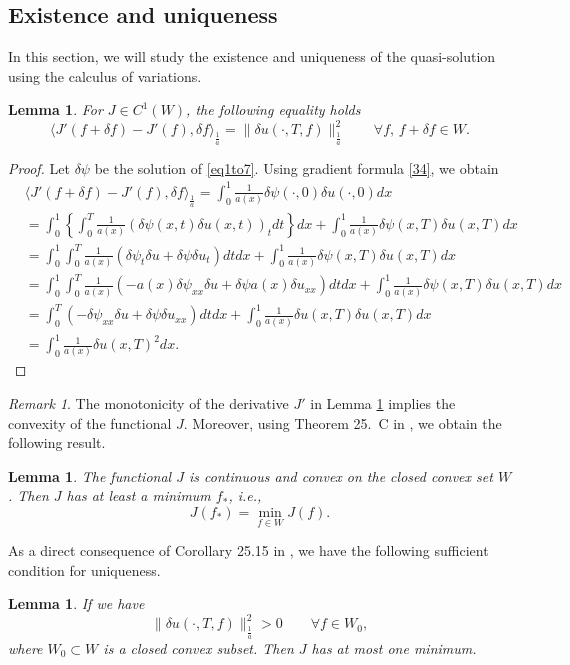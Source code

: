 \documentclass[reqno]{amsart}
\theoremstyle{plain}
\newtheorem{lemma}[theorem]{Lemma}
\theoremstyle{remark}
\newtheorem{remark}[theorem]{Remark}
\numberwithin{equation}{section}
\begin{document}
\subsection{Existence and uniqueness}
In this section, we will study the existence and uniqueness of the quasi-solution using the calculus of variations.
\begin{lemma}\label{lemmaexi}
    For $J\in C^1(W)$, the following equality holds
    $$ \langle J'(f+\delta f)-J'(f), \delta f \rangle_{\frac{1}{a}}=\|\delta u(\cdot,T,f)\|^2_{\frac{1}{a}} \qquad \forall f,\, f+\delta f \in W.$$
\end{lemma}
\begin{proof}
    Let $\delta \psi$ be the solution of \eqref{eq1to7}. Using gradient formula \eqref{34}, we obtain
    \begin{equation*}
        \begin{aligned}
    &\langle J'(f+\delta f)-J'(f), \delta f\rangle_{\frac{1}{a}}=\int_{0}^1 \frac{1}{a(x)}\delta \psi(\cdot,0)\delta u(\cdot,0) dx\\&=\int_{ 0}^1 \left\lbrace \int_{0}^T \frac{1}{a(x)}\left( \delta\psi(x,t)\delta u(x,t)\right)_{t} dt\right\rbrace dx + \int_{ 0}^1\frac{1}{a(x)}\delta\psi(x,T)\delta u(x,T) dx\\ &= \int_{ 0}^1 \int_{0}^T\frac{1}{a(x)}\left( \delta\psi_{t}\delta u + \delta\psi \delta u_{t}\right) dt dx + \int_{ 0}^1\frac{1}{a(x)}\delta\psi(x,T)\delta u(x,T) dx \\ & = \int_{ 0}^1 \int_{0}^T\frac{1}{a(x)}\left( -a(x)\delta\psi_{xx}\delta u + \delta\psi a(x)\delta u_{xx}\right) dt dx + \int_{ 0}^1\frac{1}{a(x)}\delta\psi(x,T)\delta u(x,T) dx \\&= \int_{0}^T\left( -\delta\psi_{xx}\delta u + \delta\psi\delta u_{xx}\right) dt dx + \int_{ 0}^1\frac{1}{a(x)}\delta u(x,T)\delta u(x,T) dx \\& =  \int_{ 0}^1\frac{1}{a(x)}\delta u(x,T)^2 dx .
        \end{aligned}
    \end{equation*}
\end{proof}
\begin{remark}
    The monotonicity of the derivative $J'$ in Lemma \ref{lemmaexi} implies the convexity of the functional $J$. Moreover, using Theorem 25.~C in \cite{ZEI2004}, we obtain the following result.
\end{remark}
\begin{lemma}
   The functional $J$ is continuous and convex on the closed convex set $W$. Then $J$ has at least a minimum $f_*$, i.e.,
    $$ J(f_*)= \min_{f \in W} J(f).$$
\end{lemma}
As a direct consequence of Corollary 25.15 in \cite{ZEI2004}, we have the following sufficient condition for uniqueness.
\begin{lemma}
    If we have 
    $$\|\delta u(\cdot,T,f)\|^2_{\frac{1}{a}}>0\qquad \forall f \in W_{0},$$
    where $W_0 \subset W$ is a closed convex subset. Then $J$ has at most one minimum.
\end{lemma}
\end{document}
